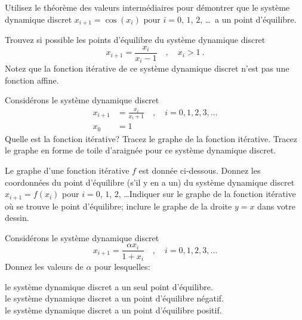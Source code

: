 \begin{question}[\life]
Utilisez le théorème des valeurs intermédiaires pour démontrer que le système
dynamique discret $x_{i+1} = \cos(x_i)$ pour $i=0$, $1$, $2$, \ldots\ a un
point d'équilibre.
\label{6Q95}
\end{question}

\begin{question}[\life]
Trouvez si possible les points d'équilibre du système dynamique discret
\[
x_{i+1} = \frac{x_i}{x_i-1}  \quad , \quad x_i > 1 \ .
\]
Notez que la fonction itérative de ce système dynamique discret n'est
pas une fonction affine.
\label{6Q96}
\end{question}

\begin{question}[\life]
Considérons le système dynamique discret
\begin{align*}
x_{i+1} &= \frac{x_i}{x_i +1}  \quad , \quad i=0, 1, 2, 3, \ldots \\
x_0 &= 1
\end{align*}
Quelle est la fonction itérative?  Tracez le graphe de la fonction
itérative.  Tracez le graphe en forme de toile d'araignée pour ce système
dynamique discret.
\label{6Q97}
\end{question}

\begin{question}[\life]
Le graphe d'une fonction itérative $f$ est donnée ci-dessous.
Donnez les coordonnées du point d'équilibre (s'il y en a un) du système
dynamique discret $x_{i+1} = f(x_i)$ pour $i=0$, $1$, $2$, \ldots  Indiquer
sur le graphe de la fonction itérative où se trouve le point d'équilibre;
inclure le graphe de la droite $y=x$ dans votre dessin.
\label{6Q98}
\end{question}

\begin{question}[\life]
Considérons le système dynamique discret
\[
x_{i+1} = \frac{\alpha x_i}{1+x_i} \quad , \quad i=0, 1, 2, 3, \ldots
\]
Donnez les valeurs de $\alpha$ pour lesquelles:

 le système dynamique discret a un seul point d'équilibre.\\
 le système dynamique discret a un point d'équilibre
négatif.\\
 le système dynamique discret a un point d'équilibre positif.
\label{6Q99}
\end{question}

